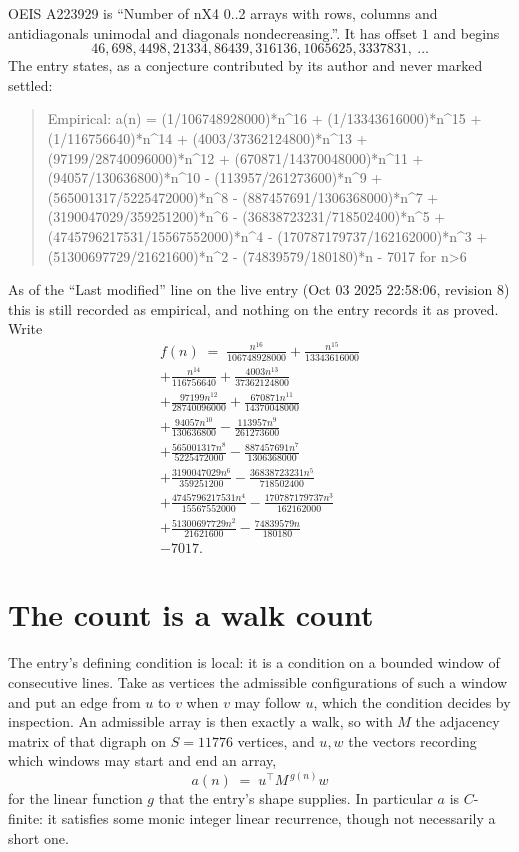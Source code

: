 \documentclass[11pt,a4paper]{article}
\theoremstyle{plain}
\theoremstyle{definition}
\begin{document}
OEIS A223929 is ``Number of nX4 0..2 arrays with rows, columns and antidiagonals unimodal and diagonals nondecreasing.''. It has offset $1$ and begins
\[
46, 698, 4498, 21334, 86439, 316136, 1065625, 3337831,\ \dots
\]
The entry states, as a conjecture contributed by its author and never marked settled:
\begin{quote}\raggedright\small
Empirical: a(n) = (1/106748928000)*n\^{}16 + (1/13343616000)*n\^{}15 + (1/116756640)*n\^{}14 + (4003/37362124800)*n\^{}13 + (97199/28740096000)*n\^{}12 + (670871/14370048000)*n\^{}11 + (94057/130636800)*n\^{}10 - (113957/261273600)*n\^{}9 + (565001317/5225472000)*n\^{}8 - (887457691/1306368000)*n\^{}7 + (3190047029/359251200)*n\^{}6 - (36838723231/718502400)*n\^{}5 + (4745796217531/15567552000)*n\^{}4 - (170787179737/162162000)*n\^{}3 + (51300697729/21621600)*n\^{}2 - (74839579/180180)*n - 7017 for n>6
\end{quote}
As of the ``Last modified'' line on the live entry (Oct 03 2025 22:58:06, revision 8) this is still
recorded as empirical, and nothing on the entry records it as proved. Write
\begin{multline*}
f(n)\;=\;\frac{n^{16}}{106748928000} + \frac{n^{15}}{13343616000} \\
+ \frac{n^{14}}{116756640} + \frac{4003 n^{13}}{37362124800} \\
+ \frac{97199 n^{12}}{28740096000} + \frac{670871 n^{11}}{14370048000} \\
+ \frac{94057 n^{10}}{130636800} - \frac{113957 n^{9}}{261273600} \\
+ \frac{565001317 n^{8}}{5225472000} - \frac{887457691 n^{7}}{1306368000} \\
+ \frac{3190047029 n^{6}}{359251200} - \frac{36838723231 n^{5}}{718502400} \\
+ \frac{4745796217531 n^{4}}{15567552000} - \frac{170787179737 n^{3}}{162162000} \\
+ \frac{51300697729 n^{2}}{21621600} - \frac{74839579 n}{180180} \\
- 7017.
\end{multline*}

\section{The count is a walk count}

The entry's defining condition is local: it is a condition on a bounded window of consecutive lines. Take as vertices the
admissible configurations of such a window and put an edge from $u$ to $v$ when $v$ may
follow $u$, which the condition decides by inspection. An admissible array is then exactly a
walk, so with $M$ the adjacency matrix of that digraph on $S=11776$ vertices, and $u,w$ the
vectors recording which windows may start and end an array,
\[
a(n)\;=\;u^{\!\top}M^{\,g(n)}w
\]
for the linear function $g$ that the entry's shape supplies. In particular $a$ is
$C$-finite: it satisfies some monic integer linear recurrence, though not necessarily a short
one.
\end{document}
